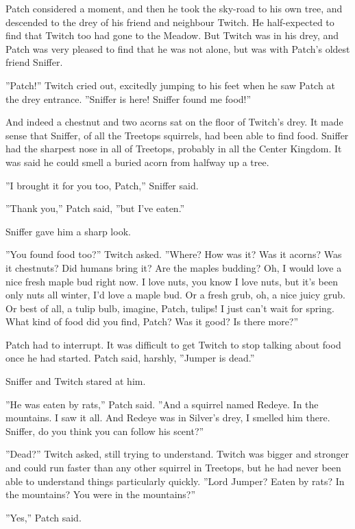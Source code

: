 \documentclass[11pt]{article}
\begin{document}
Patch considered a moment, and then he took the sky-road to his own tree, and descended to the drey of his friend and neighbour Twitch. He half-expected to find that Twitch too had gone to the Meadow. But Twitch was in his drey, and Patch was very pleased to find that he was not alone, but was with Patch's oldest friend Sniffer.\par
''Patch!'' Twitch cried out, excitedly jumping to his feet when he saw Patch at the drey entrance. ''Sniffer is here! Sniffer found me food!''\par
And indeed a chestnut and two acorns sat on the floor of Twitch's drey. It made sense that Sniffer, of all the Treetops squirrels, had been able to find food. Sniffer had the sharpest nose in all of Treetops, probably in all the Center Kingdom. It was said he could smell a buried acorn from halfway up a tree.\par
''I brought it for you too, Patch,'' Sniffer said.\par
''Thank you,'' Patch said, ''but I've eaten.''\par
Sniffer gave him a sharp look.\par
''You found food too?'' Twitch asked. ''Where? How was it? Was it acorns? Was it chestnuts? Did humans bring it? Are the maples budding? Oh, I would love a nice fresh maple bud right now. I love nuts, you know I love nuts, but it's been only nuts all winter, I'd love a maple bud. Or a fresh grub, oh, a nice juicy grub. Or best of all, a tulip bulb, imagine, Patch, tulips! I just can't wait for spring. What kind of food did you find, Patch? Was it good? Is there more?''\par
Patch had to interrupt. It was difficult to get Twitch to stop talking about food once he had started. Patch said, harshly, ''Jumper is dead.''\par
Sniffer and Twitch stared at him.\par
''He was eaten by rats,'' Patch said. ''And a squirrel named Redeye. In the mountains. I saw it all. And Redeye was in Silver's drey, I smelled him there. Sniffer, do you think you can follow his scent?''\par
''Dead?'' Twitch asked, still trying to understand. Twitch was bigger and stronger and could run faster than any other squirrel in Treetops, but he had never been able to understand things particularly quickly. ''Lord Jumper? Eaten by rats? In the mountains? You were in the mountains?''\par
''Yes,'' Patch said.\par
\end{document}

